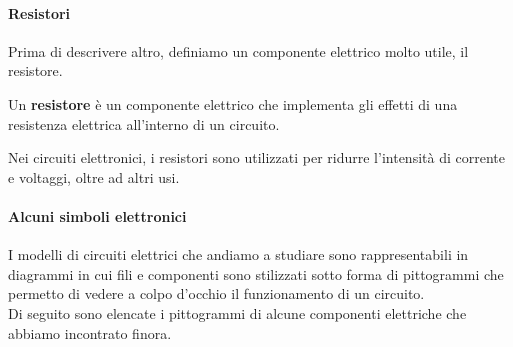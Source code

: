 \paragraph{Resistori}
Prima di descrivere altro, definiamo un componente elettrico molto utile, il resistore.
\begin{define}[Resistore]
	Un \textbf{resistore} è un componente elettrico che implementa gli effetti di una resistenza elettrica all'interno di un circuito. 
\end{define}
Nei circuiti elettronici, i resistori sono utilizzati per ridurre l'intensità di corrente e voltaggi, oltre ad altri usi.
\paragraph{Alcuni simboli elettronici}
I modelli di circuiti elettrici che andiamo a studiare sono rappresentabili in diagrammi in cui fili e componenti sono stilizzati sotto forma di pittogrammi che permetto di vedere a colpo d'occhio il funzionamento di un circuito.\\
Di seguito sono elencate i pittogrammi di alcune componenti elettriche che abbiamo incontrato finora.

